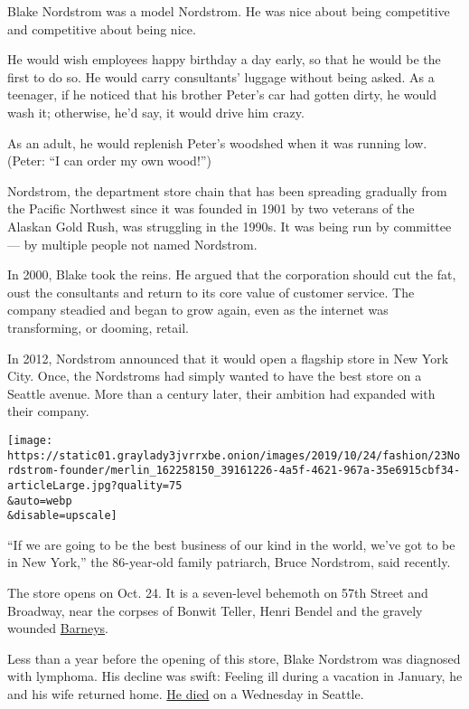 Blake Nordstrom was a model Nordstrom. He was nice about being
competitive and competitive about being nice.

He would wish employees happy birthday a day early, so that he would be
the first to do so. He would carry consultants' luggage without being
asked. As a teenager, if he noticed that his brother Peter's car had
gotten dirty, he would wash it; otherwise, he'd say, it would drive him
crazy.

As an adult, he would replenish Peter's woodshed when it was running
low. (Peter: ``I can order my own wood!'')

Nordstrom, the department store chain that has been spreading gradually
from the Pacific Northwest since it was founded in 1901 by two veterans
of the Alaskan Gold Rush, was struggling in the 1990s. It was being run
by committee --- by multiple people not named Nordstrom.

In 2000, Blake took the reins. He argued that the corporation should cut
the fat, oust the consultants and return to its core value of customer
service. The company steadied and began to grow again, even as the
internet was transforming, or dooming, retail.

In 2012, Nordstrom announced that it would open a flagship store in New
York City. Once, the Nordstroms had simply wanted to have the best store
on a Seattle avenue. More than a century later, their ambition had
expanded with their company.

\texttt{[image: https://static01.graylady3jvrrxbe.onion/images/2019/10/24/fashion/23Nordstrom-founder/merlin\_162258150\_39161226-4a5f-4621-967a-35e6915cbf34-articleLarge.jpg?quality=75\\\&auto=webp\\\&disable=upscale]}

``If we are going to be the best business of our kind in the world,
we've got to be in New York,'' the 86-year-old family patriarch, Bruce
Nordstrom, said recently.

The store opens on Oct. 24. It is a seven-level behemoth on 57th Street
and Broadway, near the corpses of Bonwit Teller, Henri Bendel and the
gravely wounded
\href{https://www.nytimes3xbfgragh.onion/2019/08/06/style/barneys-chapter-11-bankruptcy.html}{Barneys}.

Less than a year before the opening of this store, Blake Nordstrom was
diagnosed with lymphoma. His decline was swift: Feeling ill during a
vacation in January, he and his wife returned home.
\href{https://www.nytimes3xbfgragh.onion/2019/01/03/obituaries/blake-w-nordstrom-dead.html}{He
died} on a Wednesday in Seattle.

